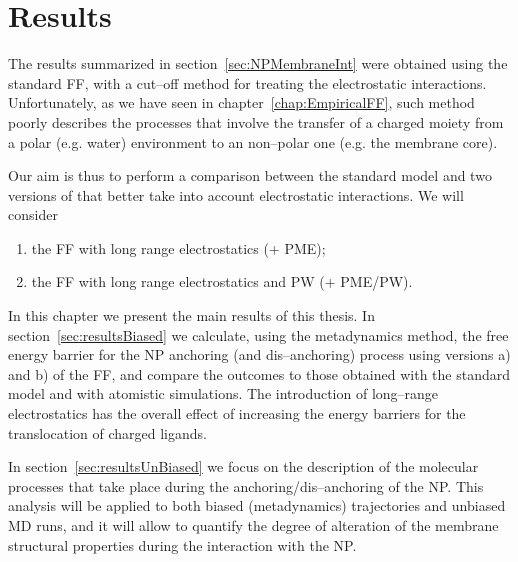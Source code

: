 \chapter{Results}
\label{chap:results}
The results summarized in section~\ref{sec:NPMembraneInt} were obtained using the standard \martini \ac{FF}, with a cut--off method for treating the electrostatic interactions. Unfortunately, as we have seen in chapter~\ref{chap:EmpiricalFF}, such method poorly describes the processes that involve the transfer of a charged moiety from a polar (e.g. water) environment to an non--polar one (e.g. the membrane core).

Our aim is thus to perform a comparison between the standard \martini model and two versions of \martini that better take into account electrostatic interactions. We will consider 
\begin{enumerate}[label=\alph*)]
	\item the \martini \ac{FF} with long range electrostatics (\martini + \ac{PME});
	\item the \martini \ac{FF} with long range electrostatics and \ac{PW} (\martini + \ac{PME}/\acs{PW}).
\end{enumerate}

In this chapter we present the main results of this thesis. In section~\ref{sec:resultsBiased} we calculate, using the metadynamics method, the free energy barrier for the \ac{NP} anchoring (and dis--anchoring) process using versions a) and b) of the \martini \ac{FF}, and compare the outcomes to those obtained with the standard \martini model and with atomistic simulations. The introduction of long--range electrostatics has the overall effect of increasing the energy barriers for the translocation of charged ligands.

In section~\ref{sec:resultsUnBiased} we focus on the description of the molecular processes that take place during the anchoring/dis--anchoring of the \ac{NP}. This analysis will be applied to both biased (metadynamics) trajectories and unbiased \ac{MD} runs, and it will allow to quantify the degree of alteration of the membrane structural properties during the interaction with the \ac{NP}.

